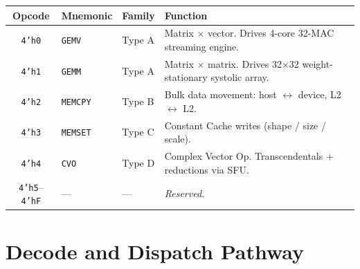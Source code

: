 \documentclass[11pt,a4paper,twoside,openany]{report}
\begin{document}
\begin{longtable}{|c|l|l|p{7.0cm}|}
\hline
\rowcolor{skytint}
\textbf{Opcode} & \textbf{Mnemonic} & \textbf{Family} & \textbf{Function} \\
\hline
\endfirsthead

\texttt{4'h0} & \texttt{GEMV}   & Type A & Matrix $\times$ vector. Drives 4-core 32-MAC streaming engine. \\
\hline
\texttt{4'h1} & \texttt{GEMM}   & Type A & Matrix $\times$ matrix. Drives 32$\times$32 weight-stationary systolic array. \\
\hline
\texttt{4'h2} & \texttt{MEMCPY} & Type B & Bulk data movement: host $\leftrightarrow$ device, L2 $\leftrightarrow$ L2. \\
\hline
\texttt{4'h3} & \texttt{MEMSET} & Type C & Constant Cache writes (shape / size / scale). \\
\hline
\texttt{4'h4} & \texttt{CVO}    & Type D & Complex Vector Op. Transcendentals + reductions via SFU. \\
\hline
\texttt{4'h5}--\texttt{4'hF} & --- & --- & \textit{Reserved.} \\
\hline
\end{longtable}

\section{Decode and Dispatch Pathway}
\end{document}

